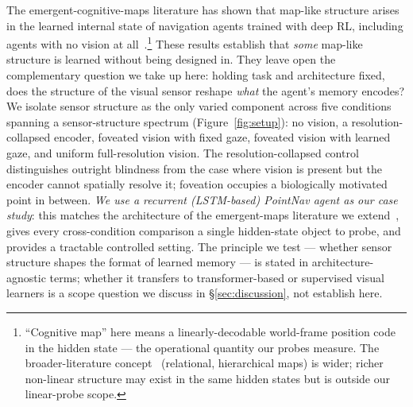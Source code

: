 \documentclass{article}
\begin{document}
The emergent-cognitive-maps literature has shown that map-like structure arises in the learned internal state of navigation agents trained with deep RL, including agents with no vision at all~\citep{wijmans2023emergence,banino2018grid,cueva2018grid}.\footnote{\small ``Cognitive map'' here means a linearly-decodable world-frame position code in the hidden state --- the operational quantity our probes measure. The broader-literature concept~\citep{epstein2017cognitive} (relational, hierarchical maps) is wider; richer non-linear structure may exist in the same hidden states but is outside our linear-probe scope.} These results establish that \emph{some} map-like structure is learned without being designed in. They leave open the complementary question we take up here: holding task and architecture fixed, does the structure of the visual sensor reshape \emph{what} the agent's memory encodes? We isolate sensor structure as the only varied component across five conditions spanning a sensor-structure spectrum (Figure~\ref{fig:setup}): no vision, a resolution-collapsed encoder, foveated vision with fixed gaze, foveated vision with learned gaze, and uniform full-resolution vision. The resolution-collapsed control distinguishes outright blindness from the case where vision is present but the encoder cannot spatially resolve it; foveation occupies a biologically motivated point in between. \emph{We use a recurrent (LSTM-based) PointNav agent as our case study}: this matches the architecture of the emergent-maps literature we extend~\citep{wijmans2023emergence}, gives every cross-condition comparison a single hidden-state object to probe, and provides a tractable controlled setting. The principle we test --- whether sensor structure shapes the format of learned memory --- is stated in architecture-agnostic terms; whether it transfers to transformer-based or supervised visual learners is a scope question we discuss in §\ref{sec:discussion}, not establish here.
\end{document}
